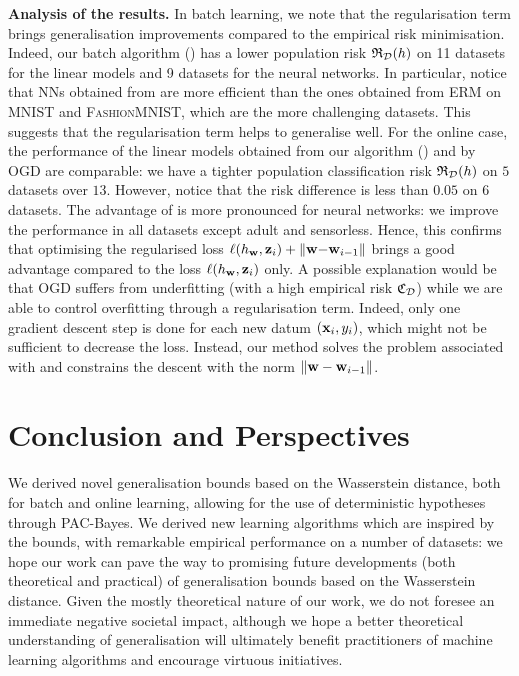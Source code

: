 \textbf{Analysis of the results.} In batch learning, we note that the regularisation term brings generalisation improvements compared to the empirical risk minimisation.
Indeed, our batch algorithm () has a lower population risk $\mathfrak{R}_{\mathcal{D}}(h)$ on 11 datasets for the linear models and 9 datasets for the neural networks. In particular, notice that NNs obtained from  are more efficient than the ones obtained from ERM on \textsc{MNIST} and \textsc{FashionMNIST}, which are the more challenging datasets.
This suggests that the regularisation term helps to generalise well.
For the online case, the performance of the linear models obtained from our algorithm () and by OGD are comparable: we have a tighter population classification risk $\mathfrak{R}_{\mathcal{D}}(h)$ on $5$ datasets over $13$. 
However, notice that the risk difference is less than $0.05$ on $6$ datasets.
The advantage of  is more pronounced for neural networks: we improve the performance in all datasets except {\sc adult} and {\sc sensorless}.
Hence, this confirms that optimising the regularised loss $\ell(h_{\mathbf{w}}, \mathbf{z}_i) + \|\mathbf{w}{-}\mathbf{w}_{i-1}\|$ brings a good advantage compared to the loss $\ell(h_{\mathbf{w}}, \mathbf{z}_i)$ only. A possible explanation would be that OGD suffers from underfitting (with a high empirical risk $\mathfrak{C}_{\mathcal{D}}$) while we are able to control overfitting through a regularisation term.
Indeed, only one gradient descent step is done for each new datum $(\mathbf{x}_i, y_i)$, which might not be sufficient to decrease the loss. 
Instead, our method solves the problem associated with  and constrains the descent with the norm $\|\mathbf{w}-\mathbf{w}_{i-1}\|$.

\section{Conclusion and Perspectives}

We derived novel generalisation bounds based on the Wasserstein distance, both for batch and online learning, allowing for the use of deterministic hypotheses through PAC-Bayes.
We derived new learning algorithms which are inspired by the bounds, with remarkable empirical performance on a number of datasets: we hope our work can pave the way to promising future developments (both theoretical and practical) of generalisation bounds based on the Wasserstein distance.
Given the mostly theoretical nature of our work, we do not foresee an immediate negative societal impact, although we hope a better theoretical understanding of generalisation will ultimately benefit practitioners of machine learning algorithms and encourage virtuous initiatives.